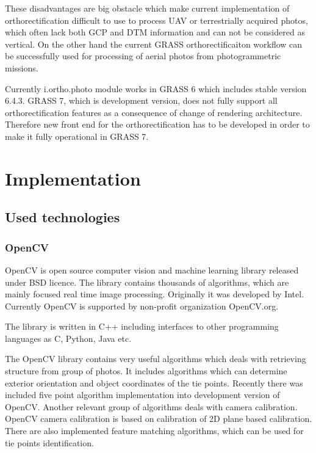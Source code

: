\documentclass[a4paper,12pt]{article}
\begin{document}
These disadvantages are big obstacle which make current implementation of orthorectification difficult to use  
to process UAV or terrestrially acquired photos, which often lack both GCP and DTM information and can not be considered as vertical.
On the other hand the current GRASS orthorectificaiton workflow can be successfully used for processing
of aerial photos from photogrammetric missions.

Currently i.ortho.photo module works in GRASS 6 which includes stable version 6.4.3.
GRASS 7, which is development version, does not fully support all orthorectification features 
as a consequence of change of rendering architecture.
Therefore new front end for the 
orthorectification has to be developed in order to make it fully operational 
in GRASS 7. 

\section{Implementation}

\subsection{Used technologies}

\subsubsection{OpenCV}

OpenCV is open source computer vision and machine learning library released under BSD licence.
The library contains thousands of algorithms, which are mainly focused real time image processing.
Originally it was developed by Intel. Currently OpenCV is supported by non-profit organization OpenCV.org.

The library is written in C++ including interfaces to other programming languages as C, Python, Java etc. 

The OpenCV library contains very useful algorithms which deals with retrieving structure from group 
of photos. It includes algorithms which can determine exterior orientation 
and object coordinates of the tie points.
Recently there was included five point algorithm implementation into development version of OpenCV.
Another relevant group of algorithms deals with camera calibration. OpenCV  camera calibration
is based on calibration of 2D plane based calibration.  
There are also implemented feature matching algorithms, which can be used for tie points identification. 
\end{document}
